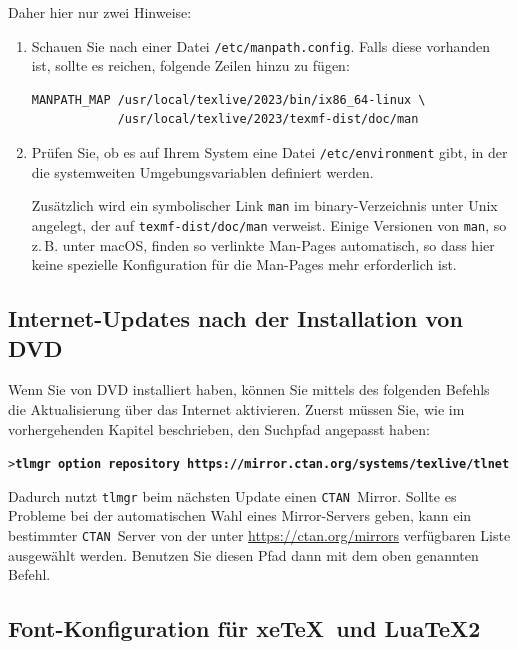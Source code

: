 \documentclass[12pt,ngerman,a4paper,fullparskip]{scrreprt}
\newcommand{\acro}[1]{\texttt{#1}}
\newcommand{\cmdname}[1]{\texttt{#1}}
\newcommand{\code}[1]{\texttt{#1}}
\newcommand{\filename}[1]{\texttt{#1}}
\newcommand{\dirname}[1]{\texttt{#1}}
\newcommand{\Ucom}[1]{\textbf{\texttt{#1}}}
\providecommand*{\CTAN}{\acro{CTAN}\xspace}
\providecommand*{\macOS}{macOS\xspace}
\begin{document}
Daher hier nur zwei Hinweise: 

\begin{enumerate}
\item Schauen Sie nach einer Datei
\filename{/etc/manpath.config}. Falls diese vorhanden ist, sollte es reichen, folgende Zeilen
hinzu zu fügen:

\begin{verbatim}
MANPATH_MAP /usr/local/texlive/2023/bin/ix86_64-linux \
            /usr/local/texlive/2023/texmf-dist/doc/man
\end{verbatim}

\item Prüfen Sie, ob es auf Ihrem System eine Datei \filename{/etc/environment} gibt, in der die
systemweiten Umgebungsvariablen definiert werden.

Zusätzlich wird ein symbolischer Link \code{man} im binary-Verzeichnis unter
Unix angelegt, der auf \dirname{texmf-dist/doc/man} verweist. Einige Versionen von \code{man}, so z.\,B. unter \macOS, finden so verlinkte Man-Pages automatisch, so dass hier keine spezielle
Konfiguration für die Man-Pages mehr erforderlich ist.

\end{enumerate}

\subsection{Internet-Updates nach der Installation von DVD}
\label{sec:dvd-install-net-updates}


Wenn Sie von DVD installiert haben, können Sie mittels des folgenden Befehls die Aktualisierung über das Internet aktivieren. Zuerst müssen Sie, wie im vorhergehenden Kapitel beschrieben, den Suchpfad angepasst haben:

\begin{alltt}
> \Ucom{tlmgr option repository https://mirror.ctan.org/systems/texlive/tlnet}
\end{alltt}

\noindent Dadurch nutzt \cmdname{tlmgr} beim nächsten Update einen \CTAN\ Mirror. Sollte es Probleme bei der automatischen Wahl eines Mirror-Servers geben, kann ein bestimmter \CTAN\ Server von der unter \url{https://ctan.org/mirrors} verfügbaren Liste ausgewählt werden. Benutzen Sie diesen Pfad dann mit dem oben genannten Befehl.

\subsection{Font-Konfiguration für xe\TeX\ und Lua\TeX2}\label{sec:font-conf-xetex}
\end{document}
